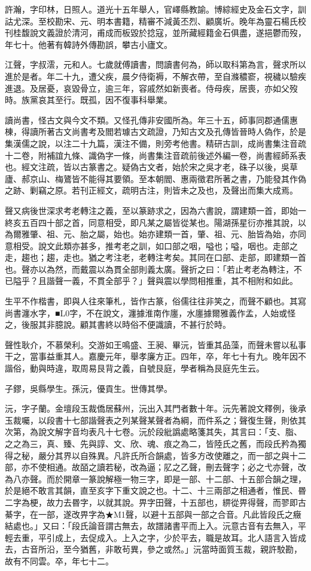 \begin{pinyinscope}
許瀚，字印林，日照人。道光十五年舉人，官嶧縣教諭。博綜經史及金石文字，訓詁尤深。至校勘宋、元、明本書籍，精審不減黃丕烈、顧廣圻。晚年為靈石楊氏校刊桂馥說文義證於清河，甫成而板毀於捻寇，並所藏經籍金石俱盡，遂挹鬱而歿，年七十。他著有韓詩外傳勘誤，攀古小廬文。

江聲，字叔澐，元和人。七歲就傅讀書，問讀書何為，師以取科第為言，聲求所以進於是者。年二十九，遭父疾，晨夕侍衛褥，不解衣帶，至自滌穠窬，視穢以驗疾進退。及居憂，哀毀骨立，逾三年，容戚然如新喪者。侍母疾，居喪，亦如父歿時。族黨哀其至行。既孤，因不復事科舉業。

讀尚書，怪古文與今文不類。又怪孔傳非安國所為。年三十五，師事同郡通儒惠棟，得讀所著古文尚書考及閻若璩古文疏證，乃知古文及孔傳皆晉時人偽作，於是集漢儒之說，以注二十九篇，漢注不備，則旁考他書。精研古訓，成尚書集注音疏十二卷，附補誼九條、識偽字一條，尚書集注音疏前後述外編一卷，尚書經師系表也。經文注疏，皆以古篆書之。疑偽古文者，始於宋之吳才老，硃子以後，吳草廬、郝京山、梅鷟皆不能得其要領。至本朝閻、惠兩徵君所著之書，乃能發其作偽之跡、剿竊之原。若刊正經文，疏明古注，則皆未之及也，及聲出而集大成焉。

聲又病後世深求考老轉注之義，至以篆跡求之，因為六書說，謂建類一首，即始一終亥五百四十部之首，同意相受，即凡某之屬皆從某也。陽湖孫星衍亦推其說，以為爾雅肇、祖、元、胎之屬，始也。始亦建類一首，肇、祖、元、胎皆為始，亦同意相受。說文此類亦甚多，推考老之訓，如口部之咽，嗌也；嗌，咽也。走部之走，趨也；趨，走也。猶之考注老，老轉注考矣。其同在口部、走部，即建類一首也。聲亦以為然，而戴震以為貫全部則義太廣。聲折之曰：「若止考老為轉注，不已隘乎？且諧聲一義，不貫全部乎？」聲與震以學問相推重，其不相附和如此。

生平不作楷書，即與人往來筆札，皆作古篆，俗儒往往非笑之，而聲不顧也。其寫尚書瀍水字，■L0字，不在說文，瀍據淮南作廛，水廛據爾雅義作孟，人始或怪之，後服其非臆說。顧其書終以時俗不便識讀，不甚行於時。

聲性耿介，不慕榮利。交游如王鳴盛、王昶、畢沅，皆重其品藻，而聲未嘗以私事干之，當事益重其人。嘉慶元年，舉孝廉方正。四年，卒，年七十有九。晚年因不諧俗，動與時違，取周易艮背之義，自號艮庭，學者稱為艮庭先生云。

子鏐，吳縣學生。孫沅，優貢生。世傳其學。

沅，字子蘭。金壇段玉裁僑居蘇州，沅出入其門者數十年。沅先著說文釋例，後承玉裁囑，以段書十七部諧聲表之列某聲某聲者為綱，而件系之；聲復生聲，則依其次第，為說文解字音均表凡十七卷。沅於段紕譌處略箋其失，其言曰：「支、脂、之之為三，真、臻、先與諄、文、欣、魂、痕之為二，皆陸氏之舊，而段氏矜為獨得之秘，嚴分其界以自殊異。凡許氏所合韻處，皆多方改使離之，而一部之與十二部，亦不使相通。故皕之讀若秘，改為逼；肊之乙聲，刪去聲字；必之弋亦聲，改為八亦聲。而於開章一篆說解極一物三字，即是一部、十二部、十五部合韻之理，於是絕不敢言其韻，直至亥字下重文說之也。十二、十三兩部之相通者，惟民、昬二字為梗，故力去昬字，以就其說。畀字田聲，十五部也，綥從畀得聲，而翏即古綦字，在一部，遂改畀字為★M1聲，以避十五部與一部之合音。凡此皆段氏之癥結處也。」又曰：「段氏論音謂古無去，故譜諸書平而上入。沅意古音有去無入，平輕去重，平引成上，去促成入。上入之字，少於平去，職是故耳。北人語言入皆成去，古音所沿，至今猶舊，非敢茍異，參之或然。」沅當時面質玉裁，親許駮勘，故有不同雲。卒，年七十二。


\end{pinyinscope}
